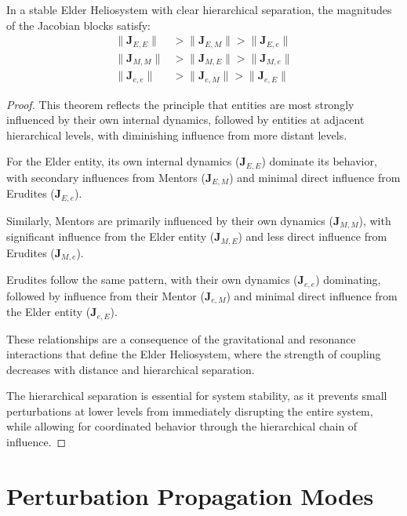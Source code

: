 \begin{theorem}
In a stable Elder Heliosystem with clear hierarchical separation, the magnitudes of the Jacobian blocks satisfy:
\begin{align}
\|\mathbf{J}_{E,E}\| &> \|\mathbf{J}_{E,M}\| > \|\mathbf{J}_{E,e}\| \\
\|\mathbf{J}_{M,M}\| &> \|\mathbf{J}_{M,E}\| > \|\mathbf{J}_{M,e}\| \\
\|\mathbf{J}_{e,e}\| &> \|\mathbf{J}_{e,M}\| > \|\mathbf{J}_{e,E}\|
\end{align}
\end{theorem}

\begin{proof}
This theorem reflects the principle that entities are most strongly influenced by their own internal dynamics, followed by entities at adjacent hierarchical levels, with diminishing influence from more distant levels.

For the Elder entity, its own internal dynamics ($\mathbf{J}_{E,E}$) dominate its behavior, with secondary influences from Mentors ($\mathbf{J}_{E,M}$) and minimal direct influence from Erudites ($\mathbf{J}_{E,e}$).

Similarly, Mentors are primarily influenced by their own dynamics ($\mathbf{J}_{M,M}$), with significant influence from the Elder entity ($\mathbf{J}_{M,E}$) and less direct influence from Erudites ($\mathbf{J}_{M,e}$).

Erudites follow the same pattern, with their own dynamics ($\mathbf{J}_{e,e}$) dominating, followed by influence from their Mentor ($\mathbf{J}_{e,M}$) and minimal direct influence from the Elder entity ($\mathbf{J}_{e,E}$).

These relationships are a consequence of the gravitational and resonance interactions that define the Elder Heliosystem, where the strength of coupling decreases with distance and hierarchical separation.

The hierarchical separation is essential for system stability, as it prevents small perturbations at lower levels from immediately disrupting the entire system, while allowing for coordinated behavior through the hierarchical chain of influence.
\end{proof}

\section{Perturbation Propagation Modes}

